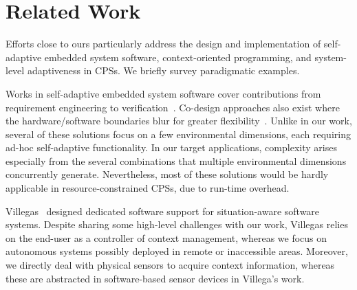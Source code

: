 \section{Related Work}
\label{sec:related}

Efforts close to ours particularly address the design and
implementation of self-adaptive embedded system software,
context-oriented programming, and system-level adaptiveness in
CPSs. We briefly survey paradigmatic examples.

Works in self-adaptive embedded system software
cover contributions from requirement engineering to
verification~\cite{cheng:adaptive}. Co-design approaches also exist
where the hardware/software boundaries blur for greater
flexibility~\cite{diguet11:closed}. Unlike in our work, several of
these solutions focus on a few environmental dimensions, each
requiring ad-hoc self-adaptive functionality. In our target
applications, complexity arises especially from the several
combinations that multiple environmental dimensions concurrently
generate. Nevertheless, most of these solutions would be hardly
applicable in resource-constrained CPSs, due to
run-time overhead.

Villegas~\cite{VilegasPhD11} designed dedicated software support for
situation-aware software systems. Despite sharing some high-level
challenges with our work, Villegas relies on the end-user as a
controller of context management, whereas we focus on autonomous
systems possibly deployed in remote or inaccessible areas. Moreover,
we directly deal with physical sensors to acquire context information,
whereas these are abstracted in software-based sensor devices in
Villega's work.


